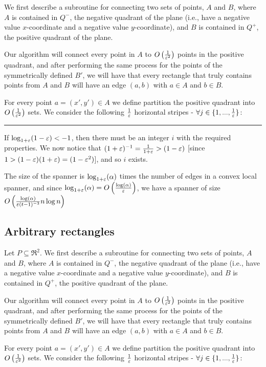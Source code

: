 \documentclass[12pt]{article}%
\begin{document}
We first describe a subroutine for connecting two sets of points, $A$
and $B$, where $A$ is contained in $Q^-$, the negative quadrant of the
plane (i.e., have a negative value $x$-coordinate and a negative value
$y$-coordinate), and $B$ is contained in $Q^+$, the positive quadrant
of the plane.

Our algorithm will connect every point in $A$ to
$O\left(\frac{1}{\varepsilon^2}\right)$ points in the positive quadrant, and
after performing the same process for the points of the symmetrically
defined $B'$, we will have that every rectangle that truly contains
points from $A$ and $B$ will have an edge $(a,b)$ with $a\in A$ and
$b\in B$.

For every point $a = (x',y') \in A$ we define partition the positive
quadrant into $O\left(\frac{1}{\varepsilon^2}\right)$ sets. We consider the
following $\frac{1}{\varepsilon}$ horizontal stripes -
$\forall j\in \{1,...,\frac{1}{\varepsilon}\}$:

\hrule

If $\log_{1+\varepsilon}(1-\varepsilon)<-1$, then there must be an integer $i$ with
the required properties. We now notice that
$(1+\varepsilon)^{-1}=\frac{1}{1+\varepsilon}>(1-\varepsilon)$ [since
$1>(1-\varepsilon)(1+\varepsilon)=(1-\varepsilon^2)$], and so $i$ exists.

The size of the spanner is $\log_{1+\varepsilon}(\alpha)$ times the number of
edges in a convex local spanner, and since
$\log_{1+\varepsilon}(\alpha)=O\left(\frac{\log(\alpha)}{\varepsilon}\right)$, we
have a spanner of size
$O\left(\frac{\log(\alpha)}{\varepsilon (t-1)^{-3}}n\log n\right)$


\subsection{Arbitrary rectangles}

Let $P\subseteq \Re^2$. We first describe a subroutine for connecting
two sets of points, $A$ and $B$, where $A$ is contained in $Q^-$, the
negative quadrant of the plane (i.e., have a negative value
$x$-coordinate and a negative value $y$-coordinate), and $B$ is
contained in $Q^+$, the positive quadrant of the plane.

Our algorithm will connect every point in $A$ to
$O\left(\frac{1}{\varepsilon^2}\right)$ points in the positive quadrant, and
after performing the same process for the points of the symmetrically
defined $B'$, we will have that every rectangle that truly contains
points from $A$ and $B$ will have an edge $(a,b)$ with $a\in A$ and
$b\in B$.

For every point $a = (x',y') \in A$ we define partition the positive
quadrant into $O\left(\frac{1}{\varepsilon^2}\right)$ sets. We consider the
following $\frac{1}{\varepsilon}$ horizontal stripes -
$\forall j\in \{1,...,\frac{1}{\varepsilon}\}$:
\end{document}
